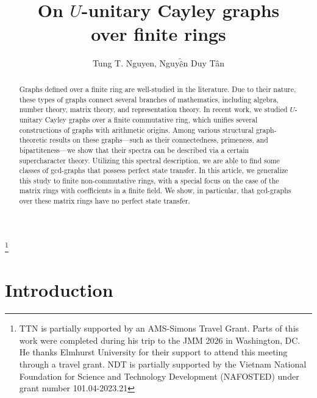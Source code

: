 \documentclass[12pt, a4paper]{amsart}
\theoremstyle{definition}
\numberwithin{equation}{section}
\begin{document}
\title{On $U$-unitary Cayley graphs \\ over finite rings}
 \author{Tung T. Nguyen, Nguy$\tilde{\text{\^{e}}}$n Duy T\^{a}n }



 \address{Department of Mathematics, Elmhurst University, Illinois, USA}
 
  \address{
Faculty of Mathematics and Informatics, Hanoi University of Science and Technology, 1 Dai Co Viet Road, Hanoi, Vietnam } 
 


\thanks{TTN is partially supported by an AMS-Simons Travel Grant. Parts of this work were completed during his trip to the JMM 2026 in Washington, DC. He thanks Elmhurst University for their support to attend this meeting through a travel grant.  NDT is partially supported by the Vietnam National
Foundation for Science and Technology Development (NAFOSTED) under grant number 101.04-2023.21}
\begin{abstract}
Graphs defined over a finite ring are well-studied in the literature. Due to their nature, these types of graphs connect several branches of mathematics, including algebra, number theory, matrix theory, and representation theory. In recent work, we studied $U$-unitary Cayley graphs over a finite commutative ring, which unifies several constructions of graphs with arithmetic origins. Among various structural graph-theoretic results on these graphs—such as their connectedness, primeness, and bipartiteness—we show that their spectra can be described via a certain supercharacter theory. Utilizing this spectral description, we are able to find some classes of gcd-graphs that possess perfect state transfer. In this article, we generalize this study to finite non-commutative rings, with a special focus on the case of the matrix rings with coefficients in a finite field. We show, in particular, that gcd-graphs over these matrix rings have no perfect state transfer.
\end{abstract}
\maketitle

\section{Introduction}
\end{document}
